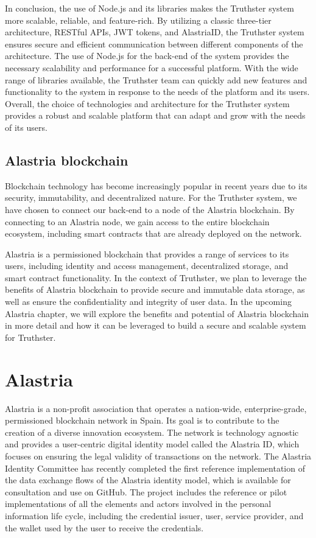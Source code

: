 \documentclass[target=mst,aauheader=]{thud}
\begin{document}
In conclusion, the use of Node.js and its libraries makes the Truthster system more scalable, reliable, and feature-rich. By utilizing a classic three-tier architecture, RESTful APIs, JWT tokens, and AlastriaID, the Truthster system ensures secure and efficient communication between different components of the architecture. The use of Node.js for the back-end of the system provides the necessary scalability and performance for a successful platform. With the wide range of libraries available, the Truthster team can quickly add new features and functionality to the system in response to the needs of the platform and its users. Overall, the choice of technologies and architecture for the Truthster system provides a robust and scalable platform that can adapt and grow with the needs of its users.

\section{Alastria blockchain}

Blockchain technology has become increasingly popular in recent years due to its security, immutability, and decentralized nature. For the Truthster system, we have chosen to connect our back-end to a node of the Alastria blockchain\cite{alastriaBlockchain}. By connecting to an Alastria node, we gain access to the entire blockchain ecosystem, including smart contracts that are already deployed on the network.\par
Alastria is a permissioned blockchain that provides a range of services to its users, including identity and access management, decentralized storage, and smart contract functionality. In the context of Truthster, we plan to leverage the benefits of Alastria blockchain to provide secure and immutable data storage, as well as ensure the confidentiality and integrity of user data. In the upcoming Alastria chapter, we will explore the benefits and potential of Alastria blockchain in more detail and how it can be leveraged to build a secure and scalable system for Truthster.







\chapter{Alastria}

Alastria is a non-profit association that operates a nation-wide, enterprise-grade, permissioned blockchain network in Spain. Its goal is to contribute to the creation of a diverse innovation ecosystem. The network is technology agnostic and provides a user-centric digital identity model called the Alastria ID, which focuses on ensuring the legal validity of transactions on the network. The Alastria Identity Committee has recently completed the first reference implementation of the data exchange flows of the Alastria identity model, which is available for consultation and use on GitHub. The project includes the reference or pilot implementations of all the elements and actors involved in the personal information life cycle, including the credential issuer, user, service provider, and the wallet used by the user to receive the credentials.
\end{document}
